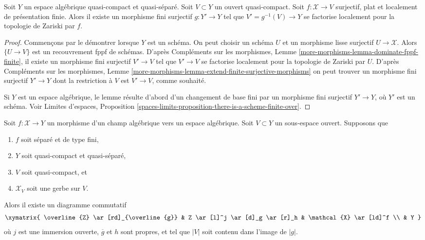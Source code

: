 \begin{lemma}
\label{lemma-finite-cover-factor}
Soit $Y$ un espace algébrique quasi-compact et quasi-séparé.
Soit $V \subset Y$ un ouvert quasi-compact. Soit $f : \mathcal{X} \to V$
surjectif, plat et localement de présentation finie.
Alors il existe un morphisme fini surjectif $g : Y' \to Y$ tel que
$V' = g^{-1}(V) \to Y$ se factorise localement pour la topologie de Zariski par $f$.
\end{lemma}

\begin{proof}
Commençons par le démontrer lorsque $Y$ est un schéma.
On peut choisir un schéma $U$ et un morphisme lisse surjectif
$U \to \mathcal{X}$. Alors $\{U \to V\}$ est un recouvrement fppf de schémas.
D'après Compléments sur les morphismes, Lemme \ref{more-morphisms-lemma-dominate-fppf-finite},
il existe un morphisme fini surjectif
$V' \to V$ tel que $V' \to V$ se factorise localement pour la topologie de Zariski
par $U$. D'après
Compléments sur les morphismes, Lemme
\ref{more-morphisms-lemma-extend-finite-surjective-morphisms}
on peut trouver un morphisme fini surjectif $Y' \to Y$
dont la restriction à $V$ est $V' \to V$, comme souhaité.

\medskip\noindent
Si $Y$ est un espace algébrique, le lemme résulte d'abord d'un
changement de base fini par un morphisme fini surjectif
$Y' \to Y$, où $Y'$ est un schéma. Voir
Limites d'espaces, Proposition
\ref{spaces-limits-proposition-there-is-a-scheme-finite-over}.
\end{proof}

\begin{lemma}
\label{lemma-make-section}
Soit $f : \mathcal{X} \to Y$ un morphisme d'un champ algébrique
vers un espace algébrique. Soit $V \subset Y$ un sous-espace ouvert.
Supposons que
\begin{enumerate}
\item $f$ soit séparé et de type fini,
\item $Y$ soit quasi-compact et quasi-séparé,
\item $V$ soit quasi-compact, et
\item $\mathcal{X}_V$ soit une gerbe sur $V$.
\end{enumerate}
Alors il existe un diagramme commutatif
$$
\xymatrix{
\overline{Z} \ar[rd]_{\overline{g}} &
Z \ar[l]^j \ar[d]_g \ar[r]_h & \mathcal{X} \ar[ld]^f \\
& Y
}
$$
où $j$ est une immersion ouverte, $\overline{g}$ et $h$ sont propres,
et tel que $|V|$ soit contenu dans l'image de $|g|$.
\end{lemma}

